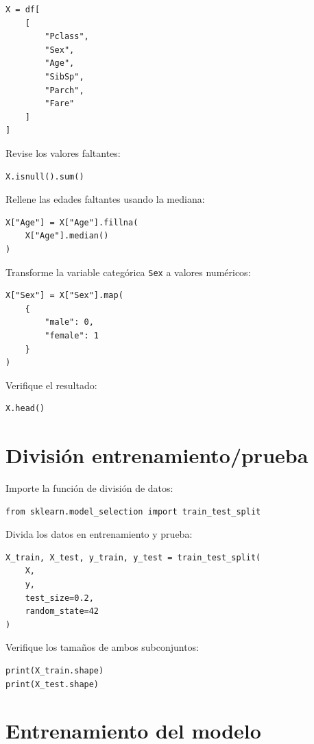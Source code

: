 \documentclass[
  coursetitle={Cómputo Nube y Tecnologías Emergentes},
  coursehours={96},
  coursedate={Verano 2026},
  doctype={Tutorial},
  otherlangs={english,french},
  authorname={Lázaro},
  authorsurname={Bustio-Martínez},
  authortitle={PhD},
  role={Profesor Investigador},
  email={lbustio@inaoe.mx},
  phone={5559504000},
  ext={7459},
  institution={Instituto Nacional de Astrofísica, Óptica y Electrónica (INAOE)},
  department={Maestría en Ciencias en Tecnologías de Seguridad},
  address={Luis Enrique Erro 1, Sta. Ma. Tonantzintla, San Andrés Cholula, CP 72840, Puebla, México},
  margin={0.5in}
]{../../lbustio_lecture_notes}
\begin{document}
\begin{lstlisting}
X = df[
    [
        "Pclass",
        "Sex",
        "Age",
        "SibSp",
        "Parch",
        "Fare"
    ]
]
\end{lstlisting}

Revise los valores faltantes:

\begin{lstlisting}
X.isnull().sum()
\end{lstlisting}

Rellene las edades faltantes usando la mediana:

\begin{lstlisting}
X["Age"] = X["Age"].fillna(
    X["Age"].median()
)
\end{lstlisting}

Transforme la variable categórica \texttt{Sex} a valores numéricos:

\begin{lstlisting}
X["Sex"] = X["Sex"].map(
    {
        "male": 0,
        "female": 1
    }
)
\end{lstlisting}

Verifique el resultado:

\begin{lstlisting}
X.head()
\end{lstlisting}

\section{División entrenamiento/prueba}

Importe la función de división de datos:

\begin{lstlisting}
from sklearn.model_selection import train_test_split
\end{lstlisting}

Divida los datos en entrenamiento y prueba:

\begin{lstlisting}
X_train, X_test, y_train, y_test = train_test_split(
    X,
    y,
    test_size=0.2,
    random_state=42
)
\end{lstlisting}

Verifique los tamaños de ambos subconjuntos:

\begin{lstlisting}
print(X_train.shape)
print(X_test.shape)
\end{lstlisting}

\section{Entrenamiento del modelo}
\end{document}
